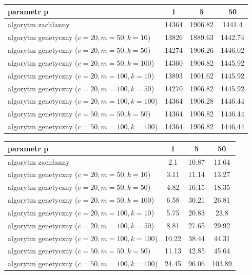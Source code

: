 \documentclass[pdflatex,11pt]{../aghdoc_version2}
\begin{document}
\begin{center}

\begin{tabular}{|l|c|c|c|}
\hline 
parametr p & 1 & 5 & 50 \\ 
\hline 
algorytm zachłanny & 14364 & 1906.82 & 1441.4 \\ 
\hline 
algorytm genetyczny ($c=20, m=50, k=10$) & 13826 & 1889.63 & 1442.74 \\ 
\hline 
algorytm genetyczny ($c=20, m=50, k=50$) & 14274 & 1906.26 & 1446.02 \\ 
\hline 
algorytm genetyczny ($c=20, m=50, k=100$) & 14360 & 1906.82 & 1445.92 \\ 
\hline 
algorytm genetyczny ($c=20, m=100, k=10$) & 13893 & 1901.62 & 1445.92 \\ 
\hline 
algorytm genetyczny ($c=20, m=100, k=50$) & 14270 & 1906.82 & 1445.92 \\ 
\hline 
algorytm genetyczny ($c=20, m=100, k=100$) & 14364 & 1906.28 & 1446.44 \\ 
\hline 
algorytm genetyczny ($c=50, m=50, k=50$) & 14364 & 1906.82 & 1446.44 \\ 
\hline 
algorytm genetyczny ($c=50, m=100, k=100$) & 14364 & 1906.82 & 1446,44 \\ 
\hline 
\end{tabular}
\end{center} 

\begin{center}

\begin{tabular}{|l|c|c|c|}
\hline 
parametr p & 1 & 5 & 50 \\ 
\hline 
algorytm zachłanny & 2.1 & 10.87 & 11.64 \\ 
\hline 
algorytm genetyczny ($c=20, m=50, k=10$) & 3.11 & 11.14 & 13.27 \\ 
\hline 
algorytm genetyczny ($c=20, m=50, k=50$) & 4.82 & 16.15 & 18.35 \\ 
\hline 
algorytm genetyczny ($c=20, m=50, k=100$) & 6.58 & 30.21 & 26.81 \\ 
\hline 
algorytm genetyczny ($c=20, m=100, k=10$) & 5.75 & 20.83 & 23.8 \\ 
\hline 
algorytm genetyczny ($c=20, m=100, k=50$) & 8.81 & 27.65 & 29.92 \\ 
\hline 
algorytm genetyczny ($c=20, m=100, k=100$) & 10.22 & 38.44 & 44.31 \\ 
\hline 
algorytm genetyczny ($c=50, m=50, k=50$) & 11.13 & 42.85 & 45.64 \\ 
\hline 
algorytm genetyczny ($c=50, m=100, k=100$) & 24.45 & 96.06 & 103.89 \\ 
\hline 
\end{tabular}
\end{center} 
\end{document}
